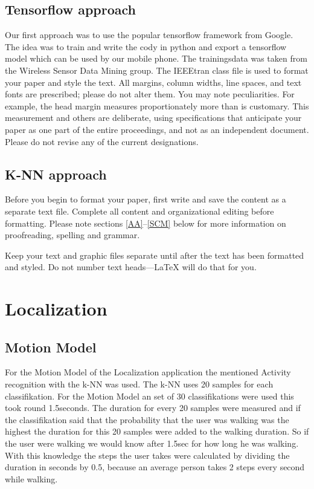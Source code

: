 \documentclass[conference]{IEEEtran}
\begin{document}
\subsection{Tensorflow approach}
Our first approach was to use the popular tensorflow framework from Google. The idea was to train and write the cody in python and export a tensorflow model which can be used by our mobile phone. The trainingsdata was taken from the Wireless Sensor Data Mining group.\cite{1}
The IEEEtran class file is used to format your paper and style the text. All margins, 
column widths, line spaces, and text fonts are prescribed; please do not 
alter them. You may note peculiarities. For example, the head margin
measures proportionately more than is customary. This measurement 
and others are deliberate, using specifications that anticipate your paper 
as one part of the entire proceedings, and not as an independent document. 
Please do not revise any of the current designations.

\subsection{K-NN approach}
Before you begin to format your paper, first write and save the content as a 
separate text file. Complete all content and organizational editing before 
formatting. Please note sections \ref{AA}--\ref{SCM} below for more information on 
proofreading, spelling and grammar.

Keep your text and graphic files separate until after the text has been 
formatted and styled. Do not number text heads---{\LaTeX} will do that 
for you.


\section*{Localization}

\subsection*{Motion Model}
For the Motion Model of the Localization application the mentioned Activity recognition with the k-NN was used. The k-NN uses 20 samples for each classifikation. For the Motion Model an set of 30 classifikations were used this took round 1.5seconds. The duration for every 20 samples were measured and if the classifikation said that the probability that the user was walking was the highest the duration for this 20 samples were added to the walking duration. So if the user were walking we would know after 1.5sec for how long he was walking. With this knowledge the steps the user takes were calculated by dividing the duration in seconds by 0.5, because an average person takes 2 steps every second while walking. 
\end{document}
